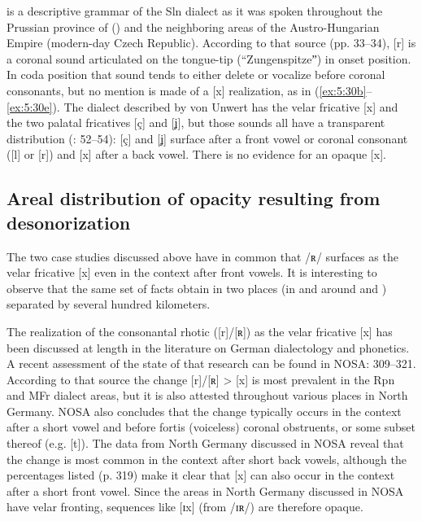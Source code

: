 \Textcite{vonUnwert1908} is a descriptive grammar of the Sln dialect as it was spoken throughout the Prussian province of  () and the neighboring areas of the Austro-Hungarian Empire (modern-day Czech Republic). According to that source (pp. 33--34), [r] is a coronal sound articulated on the tongue-tip (“Zungenspitzeˮ) in onset position. In coda position that sound tends to either delete or vocalize before coronal consonants, but no mention is made of a [x] realization, as in (\ref{ex:5:30b}--\ref{ex:5:30e}). The dialect described by von Unwert has the velar fricative [x] and the two palatal fricatives [ç] and [ʝ], but those sounds all have a transparent distribution (\citealt{vonUnwert1908}: 52--54): [ç] and [ʝ] surface after a front vowel or coronal consonant ([l] or [r]) and [x] after a back vowel. There is no evidence for an opaque [x].

\subsection{Areal distribution of opacity resulting from desonorization}\label{sec:5.3.3}
\largerpage
The two case studies discussed above have in common that /ʀ/ surfaces as the velar fricative [x] even in the context after front vowels. It is interesting to observe that the same set of facts obtain in two places (in and around  and ) separated by several hundred kilometers.

The realization of the consonantal rhotic ([r]/[ʀ]) as the velar fricative [x] has been discussed at length in the literature on German dialectology and phonetics. A recent assessment of the state of that research can be found in NOSA: 309--321. According to that source the change [r]/[ʀ] > [x] is most prevalent in the Rpn and MFr dialect areas, but it is also attested throughout various places in North Germany. NOSA also concludes that the change typically occurs in the context after a short vowel and before fortis (voiceless) coronal obstruents, or some subset thereof (e.g. [t]). The data from North Germany discussed in NOSA reveal that the change is most common in the context after short back vowels, although the percentages listed (p. 319) make it clear that [x] can also occur in the context after a short front vowel. Since the areas in North Germany discussed in NOSA have velar fronting, sequences like [ɪx] (from /ɪʀ/) are therefore opaque.

